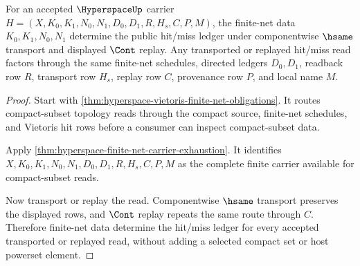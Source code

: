 \begin{theorem}
\label{thm:hyperspace-root-finite-net-hit-miss}
For an accepted $\HyperspaceUp$ carrier $H=(X,K_0,K_1,N_0,N_1,D_0,D_1,R,H_s,C,P,M)$, the finite-net data $K_0,K_1,N_0,N_1$ determine the public hit/miss ledger under componentwise $\hsame$ transport and displayed $\Cont$ replay. Any transported or replayed hit/miss read factors through the same finite-net schedules, directed ledgers $D_0,D_1$, readback row $R$, transport row $H_s$, replay row $C$, provenance row $P$, and local name $M$.
\end{theorem}
\begin{proof}
Start with \autoref{thm:hyperspace-vietoris-finite-net-obligations}. It routes compact-subset topology reads through the compact source, finite-net schedules, and Vietoris hit rows before a consumer can inspect compact-subset data.

Apply \autoref{thm:hyperspace-finite-net-carrier-exhaustion}. It identifies $X,K_0,K_1,N_0,N_1,D_0,D_1,R,H_s,C,P,M$ as the complete finite carrier available for compact-subset reads.

Now transport or replay the read. Componentwise $\hsame$ transport preserves the displayed rows, and $\Cont$ replay repeats the same route through $C$. Therefore finite-net data determine the hit/miss ledger for every accepted transported or replayed read, without adding a selected compact set or host powerset element.
\end{proof}

